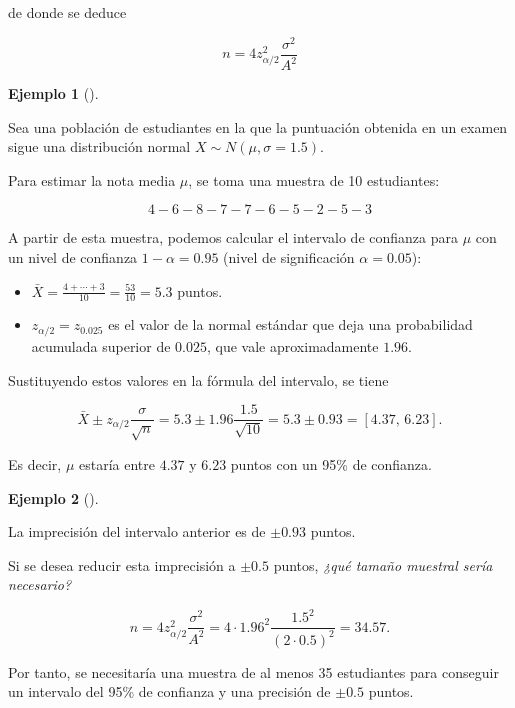 \documentclass[
  a4paper,
]{scrreport}
\providecommand{\tightlist}{%
  \setlength{\itemsep}{0pt}\setlength{\parskip}{0pt}}\usepackage{longtable,booktabs,array}
\theoremstyle{plain}
\theoremstyle{definition}
\newtheorem{example}{Ejemplo}[chapter]
\theoremstyle{definition}
\theoremstyle{remark}
\begin{document}
de donde se deduce

\[
{n = 4 z_{\alpha/2}^2\frac{\sigma^2}{A^2}}
\]

\begin{example}[]\protect\hypertarget{exm-intervalo-confianza-media}{}\label{exm-intervalo-confianza-media}

Sea una población de estudiantes en la que la puntuación obtenida en un
examen sigue una distribución normal \(X\sim N(\mu,\sigma=1.5)\).

Para estimar la nota media \(\mu\), se toma una muestra de 10
estudiantes:

\[
4 - 6 - 8 - 7 - 7 - 6 - 5 - 2 - 5 - 3
\]

A partir de esta muestra, podemos calcular el intervalo de confianza
para \(\mu\) con un nivel de confianza \(1-\alpha=0.95\) (nivel de
significación \(\alpha=0.05\)):

\begin{itemize}
\tightlist
\item
  \(\bar X = \frac{4+\cdots+3}{10}= \frac{53}{10} = 5.3\) puntos.
\item
  \(z_{\alpha/2}=z_{0.025}\) es el valor de la normal estándar que deja
  una probabilidad acumulada superior de \(0.025\), que vale
  aproximadamente \(1.96\).
\end{itemize}

Sustituyendo estos valores en la fórmula del intervalo, se tiene

\[
\bar{X}\pm z_{\alpha/2}\frac{\sigma}{\sqrt{n}} = 5.3\pm 1.96\frac{1.5}{\sqrt{10}} = 5.3\pm 0.93 = \left[4.37,\,6.23\right].
\]

Es decir, \(\mu\) estaría entre \(4.37\) y \(6.23\) puntos con un 95\%
de confianza.

\end{example}

\begin{example}[]\protect\hypertarget{exm-tamaño-muestral-media}{}\label{exm-tamaño-muestral-media}

La imprecisión del intervalo anterior es de \(\pm 0.93\) puntos.

Si se desea reducir esta imprecisión a \(\pm 0.5\) puntos, \emph{¿qué
tamaño muestral sería necesario?}

\[
n = 4 z_{\alpha/2}^2\frac{\sigma^2}{A^2} = 4\cdot 1.96^2\frac{1.5^2}{(2\cdot 0.5)^2} = 34.57.
\]

Por tanto, se necesitaría una muestra de al menos 35 estudiantes para
conseguir un intervalo del 95\% de confianza y una precisión de \(\pm
0.5\) puntos.

\end{example}
\end{document}
